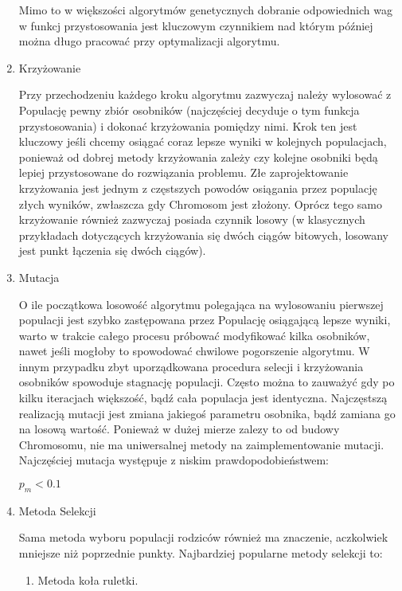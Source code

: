 \begin{par}
\begin{enumerate}
\begin{par}
		Mimo to w większości algorytmów genetycznych dobranie odpowiednich wag w funkcj przystosowania jest kluczowym czynnikiem nad którym później można długo pracować przy optymalizacji algorytmu.
	\end{par}
\item Krzyżowanie
	\begin{par}
		Przy przechodzeniu każdego kroku algorytmu zazwyczaj należy wylosować z Populację pewny zbiór osobników (najczęściej decyduje o tym funkcja przystosowania) i dokonać krzyżowania pomiędzy nimi. 
		Krok ten jest kluczowy jeśli chcemy osiągać coraz lepsze wyniki w kolejnych populacjach, ponieważ od dobrej metody krzyżowania zależy czy kolejne osobniki będą lepiej przystosowane do rozwiązania problemu.
		Złe zaprojektowanie krzyżowania jest jednym z częstszych powodów osiągania przez populację złych wyników, zwłaszcza gdy Chromosom jest złożony.
		Oprócz tego samo krzyżowanie również zazwyczaj posiada czynnik losowy (w klasycznych przykładach dotyczących krzyżowania się dwóch ciągów bitowych, losowany jest punkt łączenia się dwóch ciągów).
	\end{par}
\item Mutacja
	\begin{par}
		O ile początkowa losowość algorytmu polegająca na wylosowaniu pierwszej populacji jest szybko zastępowana przez Populację osiągającą lepsze wyniki, 
		warto w trakcie całego procesu próbować modyfikować kilka osobników, nawet jeśli mogłoby to spowodować chwilowe pogorszenie algorytmu. 
		W innym przypadku zbyt uporządkowana procedura selecji i krzyżowania osobników spowoduje stagnację populacji. 
		Często można to zauważyć gdy po kilku iteracjach większość, bądź cała populacja jest identyczna.
		Najczęstszą realizacją mutacji jest zmiana jakiegoś parametru osobnika, bądź zamiana go na losową wartość.
		Ponieważ w dużej mierze zalezy to od budowy Chromosomu, nie ma uniwersalnej metody na zaimplementowanie mutacji.
		Najczęściej mutacja występuje z niskim prawdopodobieństwem:
		\begin{center}
			$p_m < 0.1$
		\end{center}
	\end{par}
\item Metoda Selekcji
	\begin{par}
		Sama metoda wyboru populacji rodziców również ma znaczenie, aczkolwiek mniejsze niż poprzednie punkty. 
		Najbardziej popularne metody selekcji to:
		\begin{enumerate}
			\item Metoda koła ruletki.

\end{enumerate}
\end{par}
\end{enumerate}
\end{par}
